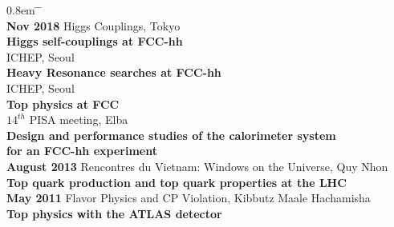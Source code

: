 \documentclass[12pt]{article}
\begin{document}
\begin{tabbing}
\itemsep0.8em
   \= \hskip  3.3cm  \=  \hskip 7.3cm \=   \\ 
 \> {\bf Nov 2018 } \> Higgs Couplings, Tokyo  \> \\
 \> \> {\bf Higgs self-couplings at FCC-hh} \>  \\[0.2cm]
 
  \> ICHEP, Seoul \>  \\
 \> \>  {\bf Heavy Resonance searches at FCC-hh}\>  \\[0.2cm]
 
  \> ICHEP, Seoul \>  \\
 \> \>  {\bf Top physics at FCC}\>  \\[0.2cm]
 
  \> $14^{th}$ PISA meeting, Elba \>  \\
  \>  \> {\bf Design and performance studies of the  calorimeter system } \> \\
  \>  \> {\bf for an FCC-hh experiment}\>  \\[0.2cm]
  
 \> {\bf August 2013 } \> Rencontres du Vietnam: Windows on the Universe, Quy Nhon \>  \\
  \>  \> {\bf Top quark production and top quark properties at the LHC} \\[0.2cm]

 \> {\bf  May 2011} \> Flavor Physics and CP Violation, Kibbutz Maale Hachamisha \>  \\
  \>  \> {\bf Top physics with the ATLAS detector} \> \\[0.2cm]
\end{tabbing}
\end{document}
